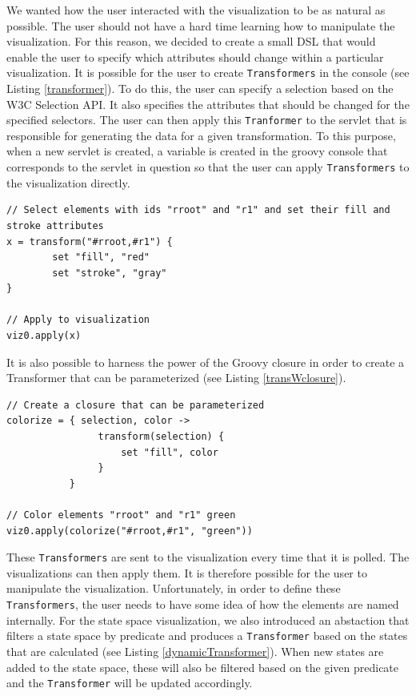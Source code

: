 We wanted how the user interacted with the visualization to be as natural as possible. The user should not have a hard time learning how to manipulate the visualization. For this reason, we decided to create a small DSL that would enable the user to specify which attributes should change within a particular visualization. It is possible for the user to create \texttt{Transformers} in the console (see Listing \ref{transformer}). To do this, the user can specify a selection based on the W3C Selection API. It also specifies the attributes that should be changed for the specified selectors. The user can then apply this \texttt{Tranformer} to the servlet that is responsible for generating the data for a given transformation. To this purpose, when a new servlet is created, a variable is created in the groovy console that corresponds to the servlet in question so that the user can apply \texttt{Transformers} to the visualization directly.

\lstset{language=java}
\begin{lstlisting}[caption=Define rules for the transformation of visualization elements,label=transformer]
// Select elements with ids "rroot" and "r1" and set their fill and stroke attributes
x = transform("#rroot,#r1") {
        set "fill", "red"
        set "stroke", "gray"
}

// Apply to visualization
viz0.apply(x)
\end{lstlisting}

It is also possible to harness the power of the Groovy closure in order to create a Transformer that can be parameterized (see Listing \ref{transWclosure}).

\begin{lstlisting}[caption=Use Groovy closures to generate Transformers,label=transWclosure]
// Create a closure that can be parameterized
colorize = { selection, color ->
                transform(selection) {
                    set "fill", color
                }    
           }

// Color elements "rroot" and "r1" green
viz0.apply(colorize("#rroot,#r1", "green"))
\end{lstlisting}

These \texttt{Transformers} are sent to the visualization every time that it is polled. The visualizations can then apply them. It is therefore possible for the user to manipulate the visualization. Unfortunately, in order to define these \texttt{Transformers}, the user needs to have some idea of how the elements are named internally. For the state space visualization, we also introduced an abstaction that filters a state space by predicate and produces a \texttt{Transformer} based on the states that are calculated (see Listing \ref{dynamicTransformer}). When new states are added to the state space, these will also be filtered based on the given predicate and the \texttt{Transformer} will be updated accordingly. 

